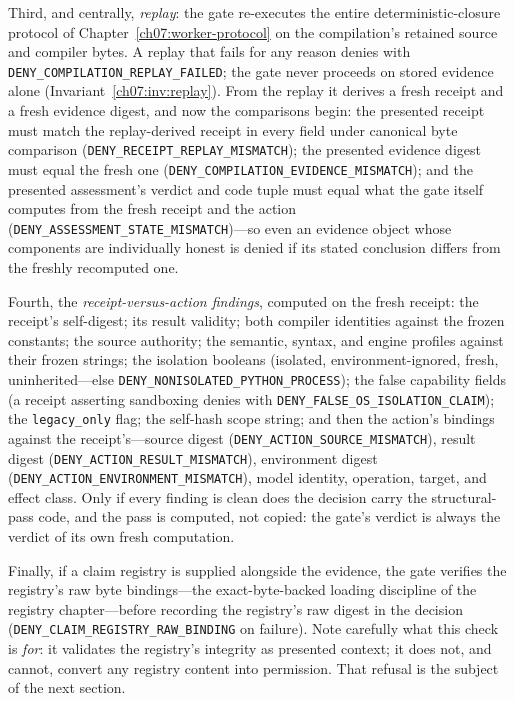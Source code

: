 Third, and centrally, \emph{replay}: the gate re-executes the entire deterministic-closure protocol of Chapter~\ref{ch07:worker-protocol} on the compilation's retained source and compiler bytes. A replay that fails for any reason denies with \texttt{DENY\_COMPILATION\_REPLAY\_FAILED}; the gate never proceeds on stored evidence alone (Invariant~\ref{ch07:inv:replay}). From the replay it derives a fresh receipt and a fresh evidence digest, and now the comparisons begin: the presented receipt must match the replay-derived receipt in every field under canonical byte comparison (\texttt{DENY\_RECEIPT\_REPLAY\_MISMATCH}); the presented evidence digest must equal the fresh one (\texttt{DENY\_COMPILATION\_EVIDENCE\_MISMATCH}); and the presented assessment's verdict and code tuple must equal what the gate itself computes from the fresh receipt and the action (\texttt{DENY\_ASSESSMENT\_STATE\_MISMATCH})---so even an evidence object whose components are individually honest is denied if its stated conclusion differs from the freshly recomputed one.

Fourth, the \emph{receipt-versus-action findings}, computed on the fresh receipt: the receipt's self-digest; its result validity; both compiler identities against the frozen constants; the source authority; the semantic, syntax, and engine profiles against their frozen strings; the isolation booleans (isolated, environment-ignored, fresh, uninherited---else \texttt{DENY\_NONISOLATED\_PYTHON\_PROCESS}); the false capability fields (a receipt asserting sandboxing denies with \texttt{DENY\_FALSE\_OS\_ISOLATION\_CLAIM}); the \texttt{legacy\_only} flag; the self-hash scope string; and then the action's bindings against the receipt's---source digest (\texttt{DENY\_ACTION\_SOURCE\_MISMATCH}), result digest (\texttt{DENY\_ACTION\_RESULT\_MISMATCH}), environment digest (\texttt{DENY\_ACTION\_ENVIRONMENT\_MISMATCH}), model identity, operation, target, and effect class. Only if every finding is clean does the decision carry the structural-pass code, and the pass is computed, not copied: the gate's verdict is always the verdict of its own fresh computation.

Finally, if a claim registry is supplied alongside the evidence, the gate verifies the registry's raw byte bindings---the exact-byte-backed loading discipline of the registry chapter---before recording the registry's raw digest in the decision (\texttt{DENY\_CLAIM\_REGISTRY\_RAW\_BINDING} on failure). Note carefully what this check is \emph{for}: it validates the registry's integrity as presented context; it does not, and cannot, convert any registry content into permission. That refusal is the subject of the next section.

